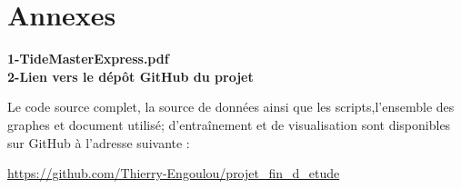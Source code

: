 \documentclass[a4paper,12pt,openany]{report}
\begin{document}
	
	

%	
 
    \clearpage
    \chapter*{Annexes}
    
    	\centering
 \textbf{1-TideMasterExpress.pdf}\\	
 \textbf{2-Lien vers le dépôt GitHub du projet}
  
  Le code source complet, la source  de données ainsi que les scripts,l'ensemble des graphes et document utilisé; d'entraînement et de visualisation sont disponibles sur GitHub à l'adresse suivante :
  
  \href{https://github.com/Thierry-Engoulou/projet_fin_d_etude}{https://github.com/Thierry-Engoulou/projet\_fin\_d\_etude}
  
	
	
	
\end{document}
